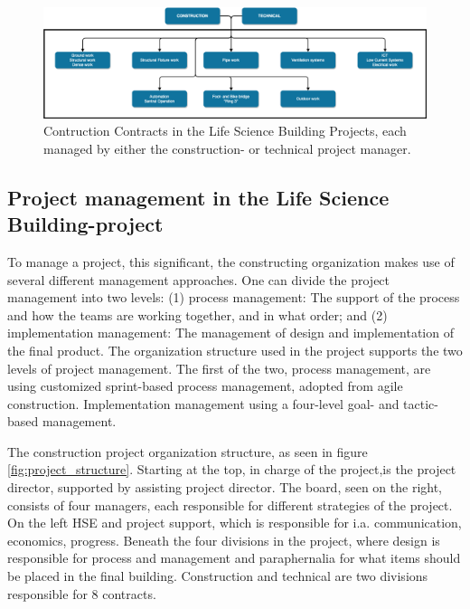 \begin{figure}
    \centering
    \includegraphics[width=\textwidth]{fig/LVB_contracts.png}
    \caption{Contruction Contracts in the Life Science Building Projects, each managed by either the construction- or technical project manager.}
    \label{fig:project_contracts}
\end{figure}

\subsection*{Project management in the Life Science Building-project}
To manage a project, this significant, the constructing organization makes use of several different management approaches. One can divide the project management into two levels: (1) process management: The support of the process and how the teams are working together, and in what order; and (2) implementation management: The management of design and implementation of the final product. The organization structure used in the project supports the two levels of project management. The first of the two, process management, are using customized sprint-based process management, adopted from agile construction. Implementation management using a four-level goal- and tactic-based management.  

The construction project organization structure, as seen in figure \ref{fig:project_structure}. Starting at the top, in charge of the project,is the project director, supported by assisting project director. The board, seen on the right, consists of four managers, each responsible for different strategies of the project. On the left HSE and project support, which is responsible for i.a. communication, economics, progress. Beneath the four divisions in the project, where design is responsible for process and management and paraphernalia for what items should be placed in the final building. Construction and technical are two divisions responsible for 8 contracts.

